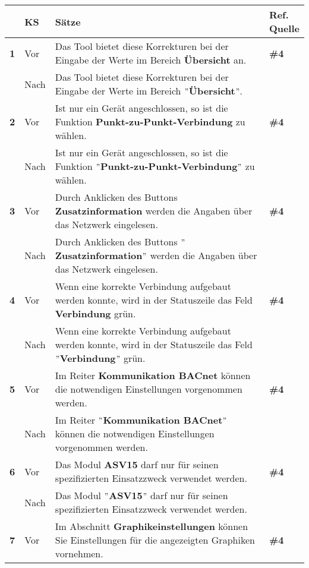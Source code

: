 \begin{longtable}{llp{}l}

\lsptoprule
{} & \textbf{KS} & \textbf{Sätze} & \makecell[tl]{\textbf{Ref.}\\\textbf{Quelle}}\\
\midrule
{ \textbf{1}} & Vor & Das Tool bietet diese Korrekturen bei der Eingabe der Werte im Bereich \textbf{Übersicht} an. & \textbf{\#4}\\
& Nach & Das Tool bietet diese Korrekturen bei der Eingabe der Werte im Bereich \textbf{$"$Übersicht$"$}. & \\
\tablevspace
{ \textbf{2}} & Vor & Ist nur ein Gerät angeschlossen, so ist die Funktion \textbf{Punkt-zu-Punkt-Verbindung} zu wählen. & \textbf{\#4}\\
& Nach & Ist nur ein Gerät angeschlossen, so ist die Funktion \textbf{$"$Punkt-zu-Punkt-Verbindung$"$} zu wählen. & \\
\tablevspace
{ \textbf{3}} & Vor & Durch Anklicken des Buttons \textbf{Zusatzinformation} werden die Angaben über das Netzwerk eingelesen. & \textbf{\#4}\\
& Nach & Durch Anklicken des Buttons \textbf{$"$Zusatzinformation$"$} werden die Angaben über das Netzwerk eingelesen. & \\
\tablevspace
{ \textbf{4}} & Vor & Wenn eine korrekte Verbindung aufgebaut werden konnte, wird in der Statuszeile das Feld \textbf{Verbindung} grün. & \textbf{\#4}\\
& Nach & Wenn eine korrekte Verbindung aufgebaut werden konnte, wird in der Statuszeile das Feld \textbf{$"$Verbindung$"$} grün. & \\
\tablevspace
{ \textbf{5}} & Vor & Im Reiter \textbf{Kommunikation BACnet} können die notwendigen Einstellungen vorgenommen werden. & \textbf{\#4}\\
& Nach & Im Reiter \textbf{$"$Kommunikation BACnet$"$} können die notwendigen Einstellungen vorgenommen werden. & \\
\tablevspace
{ \textbf{6}} & Vor & Das Modul \textbf{ASV15} darf nur für seinen spezifizierten Einsatzzweck verwendet werden. & \textbf{\#4}\\
& Nach & Das Modul \textbf{$"$ASV15$"$} darf nur für seinen spezifizierten Einsatzzweck verwendet werden. & \\
\tablevspace
{ \textbf{7}} & Vor & Im Abschnitt \textbf{Graphikeinstellungen} können Sie Einstellungen für die angezeigten Graphiken vornehmen. & \textbf{\#4}\\

\end{longtable}
